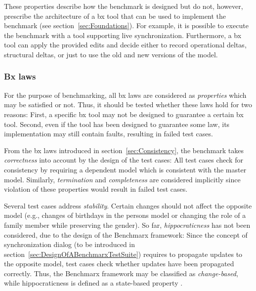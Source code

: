 %	
%
These properties describe how the benchmark is designed but do not, however, prescribe the architecture of a bx tool that can be used to implement the benchmark (see section~\ref{sec:Foundations}).
For example, it is possible to execute the benchmark with a tool supporting live synchronization. Furthermore, a bx tool can apply the provided edits and decide either to record operational deltas, structural deltas, or just to use the old and new versions of the model.

\subsubsection{Bx laws}
\label{sec:BxLaws}

For the purpose of benchmarking, all bx laws are considered as \emph{properties} which may be satisfied or not. Thus, it should be tested whether these laws hold for two reasons: First, a specific bx tool may not be designed to guarantee a certain bx tool. Second, even if the tool has been designed to guarantee some law, its implementation may still contain faults, resulting in failed test cases.

From the bx  laws introduced in section~\ref{sec:Consistency}, the benchmark takes \emph{correctness} into account by the design of the test cases: All test cases check for consistency by requiring a dependent model which is consistent with the master model. Similarly, \emph{termination} and \emph{completeness} are considered implicitly since violation of these properties would result in failed test cases.

Several test cases address \emph{stability}. Certain changes should not affect the opposite model (e.g., changes of birthdays in the persons model or changing the role of a family member while preserving the gender). So far, \emph{hippocraticness} has not been considered, due to the design of the Benchmarx framework: Since the concept of synchronization dialog (to be introduced in section~\ref{sec:DesignOfABenchmarxTestSuite}) requires to propagate updates to the opposite model, test cases check whether updates have been propagated correctly. Thus, the Benchmarx framework may be classified as \emph{change-based}, while hippocraticness is defined as a state-based property \cite{SOSYM-Stevens2010}.

